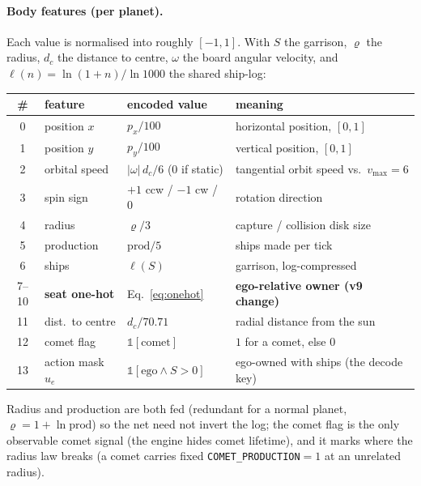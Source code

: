 \documentclass[11pt]{article}
\newcommand{\cd}[1]{\texttt{#1}}
\begin{document}
\paragraph{Body features (per planet).} Each value is normalised into roughly $[-1,1]$. With $S$ the
garrison, $\varrho$ the radius, $d_c$ the distance to centre, $\omega$ the board angular velocity, and
$\ell(n)=\ln(1{+}n)/\ln 1000$ the shared ship-log:
\begin{center}\small
\begin{tabular}{@{}clll@{}}
\toprule
\# & feature & encoded value & meaning \\
\midrule
0  & position $x$        & $p_x/100$                          & horizontal position, $[0,1]$ \\
1  & position $y$        & $p_y/100$                          & vertical position, $[0,1]$ \\
2  & orbital speed       & $|\omega|\,d_c/6$ ($0$ if static)  & tangential orbit speed vs.\ $v_{\max}{=}6$ \\
3  & spin sign           & $+1$ ccw / $-1$ cw / $0$           & rotation direction \\
4  & radius              & $\varrho/3$                        & capture / collision disk size \\
5  & production          & $\mathrm{prod}/5$                  & ships made per tick \\
6  & ships               & $\ell(S)$                          & garrison, log-compressed \\
7--10 & \textbf{seat one-hot} & Eq.~\eqref{eq:onehot}          & \textbf{ego-relative owner (v9 change)} \\
11 & dist.\ to centre    & $d_c/70.71$                        & radial distance from the sun \\
12 & comet flag          & $\mathbb 1[\text{comet}]$          & $1$ for a comet, else $0$ \\
13 & action mask $u_e$   & $\mathbb 1[\text{ego}\wedge S{>}0]$ & ego-owned with ships (the decode key) \\
\bottomrule
\end{tabular}
\end{center}
Radius and production are both fed (redundant for a normal planet, $\varrho=1{+}\ln\mathrm{prod}$) so
the net need not invert the log; the comet flag is the only observable comet signal (the engine hides
comet lifetime), and it marks where the radius law breaks (a comet carries fixed
\cd{COMET\_PRODUCTION}$=1$ at an unrelated radius).
\end{document}

